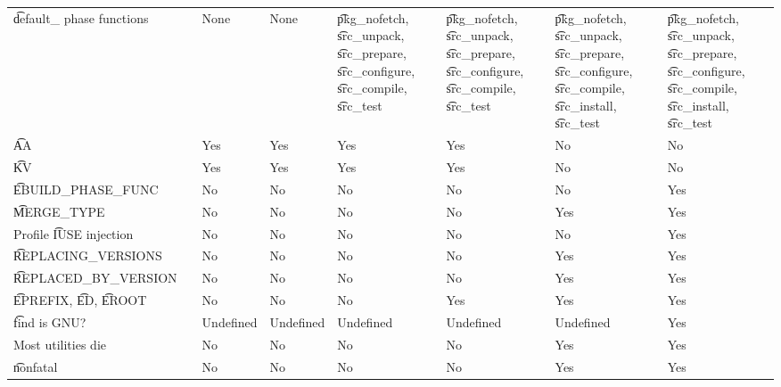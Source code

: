 \begin{landscape}
\begin{longtable}{llP{5em}P{5em}P{6em}P{6em}P{6em}P{6em}}
\t{default\_} phase functions &  &
    None & None &
    \t{pkg\_nofetch}, \t{src\_unpack}, \t{src\_prepare}, \t{src\_configure}, \t{src\_compile}, \t{src\_test} &
    \t{pkg\_nofetch}, \t{src\_unpack}, \t{src\_prepare}, \t{src\_configure}, \t{src\_compile}, \t{src\_test} &
    \t{pkg\_nofetch}, \t{src\_unpack}, \t{src\_prepare}, \t{src\_configure},
        \t{src\_compile}, \t{src\_install}, \t{src\_test} &
    \t{pkg\_nofetch}, \t{src\_unpack}, \t{src\_prepare}, \t{src\_configure},
        \t{src\_compile}, \t{src\_install}, \t{src\_test} \\

\t{AA} &  &
    Yes & Yes & Yes & Yes & No & No \\

\t{KV} &  &
    Yes & Yes & Yes & Yes & No & No \\

\t{EBUILD\_PHASE\_FUNC} &  &
    No & No & No & No & No & Yes \\

\t{MERGE\_TYPE} &  &
    No & No & No & No & Yes & Yes \\

Profile \t{IUSE} injection &  &
    No & No & No & No & No & Yes \\

\t{REPLACING\_VERSIONS} &  &
    No & No & No & No & Yes & Yes \\

\t{REPLACED\_BY\_VERSION} &  &
    No & No & No & No & Yes & Yes \\

\t{EPREFIX}, \t{ED}, \t{EROOT} &  &
    No & No & No & Yes & Yes & Yes \\

\t{find} is GNU? &  &
    Undefined & Undefined & Undefined & Undefined & Undefined & Yes \\

Most utilities die &  &
    No & No & No & No & Yes & Yes \\

\t{nonfatal} &  &
    No & No & No & No & Yes & Yes \\


\end{longtable}
\end{landscape}
